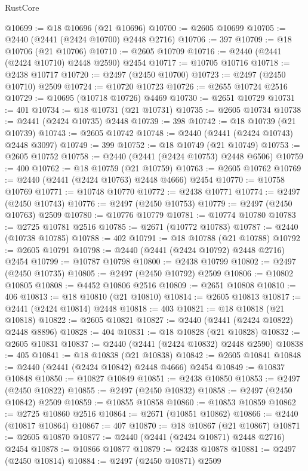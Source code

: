 \begin{lexlean}{RustCore}
\begin{coremodule}
@10699 := @18 @10696 (@21 @10696)
@10700 := @2605 @10699
@10705 := @2440 (@2441 (@2424 @10700) @2448 @2716)
@10706 := 397
@10709 := @18 @10706 (@21 @10706)
@10710 := @2605 @10709
@10716 := @2440 (@2441 (@2424 @10710) @2448 @2590) @2454
@10717 := @10705 @10716
@10718 := @2438 @10717
@10720 := @2497 (@2450 @10700)
@10723 := @2497 (@2450 @10710) @2509
@10724 := @10720 @10723
@10726 := @2655 @10724 @2516
@10729 := @10695 (@10718 @10726) @4469
@10730 := @2651 @10729
@10731 := 401
@10734 := @18 @10731 (@21 @10731)
@10735 := @2605 @10734
@10738 := @2441 (@2424 @10735) @2448
@10739 := 398
@10742 := @18 @10739 (@21 @10739)
@10743 := @2605 @10742
@10748 := @2440 (@2441 (@2424 @10743) @2448 @3097)
@10749 := 399
@10752 := @18 @10749 (@21 @10749)
@10753 := @2605 @10752
@10758 := @2440 (@2441 (@2424 @10753) @2448 @6506)
@10759 := 400
@10762 := @18 @10759 (@21 @10759)
@10763 := @2605 @10762
@10769 := @2440 (@2441 (@2424 @10763) @2448 @4666) @2454
@10770 := @10758 @10769
@10771 := @10748 @10770
@10772 := @2438 @10771
@10774 := @2497 (@2450 @10743)
@10776 := @2497 (@2450 @10753)
@10779 := @2497 (@2450 @10763) @2509
@10780 := @10776 @10779
@10781 := @10774 @10780
@10783 := @2725 @10781 @2516
@10785 := @2671 (@10772 @10783)
@10787 := @2440 (@10738 @10785)
@10788 := 402
@10791 := @18 @10788 (@21 @10788)
@10792 := @2605 @10791
@10798 := @2440 (@2441 (@2424 @10792) @2448 @2716) @2454
@10799 := @10787 @10798
@10800 := @2438 @10799
@10802 := @2497 (@2450 @10735)
@10805 := @2497 (@2450 @10792) @2509
@10806 := @10802 @10805
@10808 := @4452 @10806 @2516
@10809 := @2651 @10808
@10810 := 406
@10813 := @18 @10810 (@21 @10810)
@10814 := @2605 @10813
@10817 := @2441 (@2424 @10814) @2448
@10818 := 403
@10821 := @18 @10818 (@21 @10818)
@10822 := @2605 @10821
@10827 := @2440 (@2441 (@2424 @10822) @2448 @8896)
@10828 := 404
@10831 := @18 @10828 (@21 @10828)
@10832 := @2605 @10831
@10837 := @2440 (@2441 (@2424 @10832) @2448 @2590)
@10838 := 405
@10841 := @18 @10838 (@21 @10838)
@10842 := @2605 @10841
@10848 := @2440 (@2441 (@2424 @10842) @2448 @4666) @2454
@10849 := @10837 @10848
@10850 := @10827 @10849
@10851 := @2438 @10850
@10853 := @2497 (@2450 @10822)
@10855 := @2497 (@2450 @10832)
@10858 := @2497 (@2450 @10842) @2509
@10859 := @10855 @10858
@10860 := @10853 @10859
@10862 := @2725 @10860 @2516
@10864 := @2671 (@10851 @10862)
@10866 := @2440 (@10817 @10864)
@10867 := 407
@10870 := @18 @10867 (@21 @10867)
@10871 := @2605 @10870
@10877 := @2440 (@2441 (@2424 @10871) @2448 @2716) @2454
@10878 := @10866 @10877
@10879 := @2438 @10878
@10881 := @2497 (@2450 @10814)
@10884 := @2497 (@2450 @10871) @2509

\end{coremodule}
\end{lexlean}
